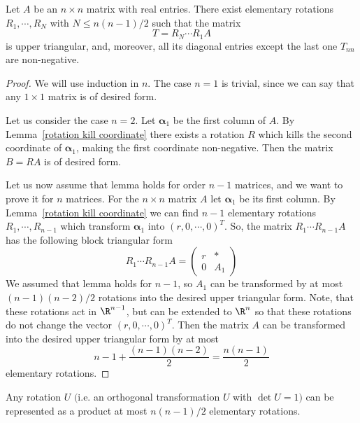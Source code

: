 \begin{lemma}\label{matrix real entries triangular}
Let $A$ be an $n\times n$ matrix with real entries. There exist elementary rotations $R_1,\cdots,R_{N}$ with $N\leq n(n-1)/2$ such that the matrix 
\[T=R_N\cdots R_1A\]
is upper triangular, and, moreover, all its diagonal entries except the last one $T_{nn}$ are non-negative.
\end{lemma}
\begin{proof}
We will use induction in $n$. The case $n=1$ is trivial, since we can say that any $1\times 1$ matrix is of desired form.\par
Let us consider the case $n=2$. Let $\bm{\alpha}_1$ be the first column of $A$. By Lemma~\ref{rotation kill coordinate} there exists a rotation $R$ which kills the second coordinate of $\bm{\alpha}_1$, making the first coordinate non-negative. Then the matrix $B=RA$ is of desired form.\par
Let us now assume that lemma holds for order $n-1$ matrices, and we want to prove it for $n$ matrices. For the $n\times n$ matrix $A$ let $\bm{\alpha}_1$ be its first column. By Lemma~\ref{rotation kill coordinate} we can find $n-1$ elementary rotations $R_1,\cdots,R_{n-1}$ which transform $\bm{\alpha}_1$ into $(r,0,\cdots,0)^T$. So, the matrix $R_1\cdots R_{n-1}A$ has the following block triangular form
\[R_1\cdots R_{n-1}A=\begin{pmatrix}
r&*\\
0&A_1
\end{pmatrix}\]
We assumed that lemma holds for $n-1$, so $A_1$ can be transformed by at most $(n-1)(n-2)/2$ rotations into the desired upper triangular form. Note, that these rotations act in $\R^{n-1}$, but can be extended to $\R^n$ so that these rotations do not change the vector $(r,0,\cdots,0)^T$. Then the matrix $A$ can be transformed into the desired upper triangular form by at most 
\[n-1+\frac{(n-1)(n-2)}{2}=\frac{n(n-1)}{2}\]
elementary rotations.
\end{proof}
\begin{theorem}
Any rotation $U$ $($i.e. an orthogonal transformation $U$ with $\det U=1$$)$ can be represented as a product at most $n(n-1)/2$ elementary rotations.
\end{theorem}
